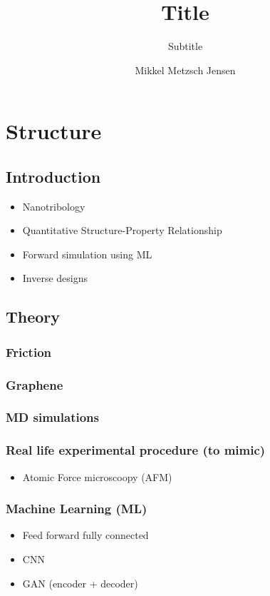 \documentclass[UKenglish]{book}
\title{Title}
\subtitle{Subtitle}
\author{Mikkel Metzsch Jensen}
\begin{document}
\duoforside[dept={Department of Physics},
  program={Master's Program Name},
  long]                                         

\frontmatter{}


\tableofcontents{}

\mainmatter{}
\section*{Structure}   
\subsection*{Introduction}
\begin{itemize}
  \item Nanotribology
  \item Quantitative Structure-Property Relationship
  \item Forward simulation using ML
  \item Inverse designs
\end{itemize}
\subsection*{Theory}
\subsubsection*{Friction}
\subsubsection*{Graphene}
\subsubsection*{MD simulations}
\subsubsection*{Real life experimental procedure (to mimic)}
\begin{itemize}
  \item Atomic Force microscoopy (AFM)
\end{itemize}
\subsubsection*{Machine Learning (ML)}
\begin{itemize}
  \item Feed forward fully connected
  \item CNN
  \item GAN (encoder + decoder)
\end{itemize}
\end{document}
